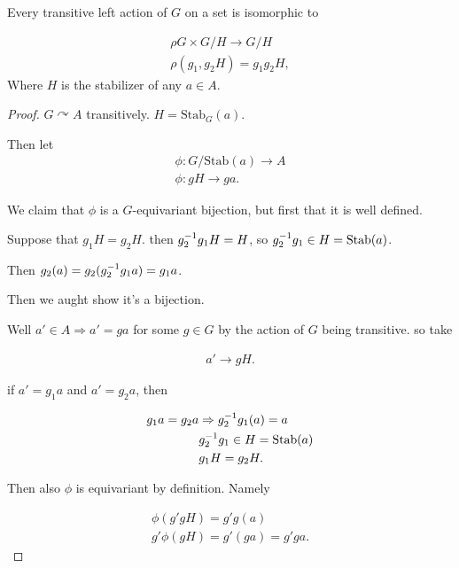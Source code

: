 \documentclass[12pt, twosided]{article}
\begin{document}
\begin{prop}
  Every transitive left action of \(G\) on a set is isomorphic to

  \begin{align*}
    \rho G \times G/H \to G/H \\
    \rho(g_1, g_2H) = g_1g_2H,
  \end{align*}
  Where \(H\) is the stabilizer of any \(a \in A\).
\end{prop}
\begin{proof}
  \(G \curvearrowright A\) transitively. \(H = \mathrm{Stab}_G(a)\).

  Then let
  \begin{align*}
    \phi: G/\mathrm{Stab}(a) \to A \\
    \phi: gH \to ga.
  \end{align*}

  We claim that \(\phi\) is a \(G\)-equivariant bijection, but first that it is well defined.

  Suppose that \(g_1H = g_2H\). then \(g_2^{-1}g_1H = H\), so \(g_2^{-1}g_1 \in H = \mathrm{Stab}(a)\).

  Then \(g_2(a) = g_2(g_2^{-1}g_1a) = g_1a\). \partdone

  Then we aught show it's a bijection.

  Well \(a\prime \in A \Rightarrow a\prime = ga\) for some \(g \in G\) by the action of \(G\) being transitive. so take

  \begin{align*}
    a\prime \longrightarrow gH.
  \end{align*}

  if \(a\prime = g_1a\) and \(a\prime = g_2a\), then

  \begin{align*}
    g_1a = g_2a &\Rightarrow g_2^{-1}g_1(a) = a \\
                & g_2^{-1}g_1 \in H = \mathrm{Stab}(a) \\
                &g_1H = g_2H.
  \end{align*} \partdone

  Then also \(\phi\) is equivariant by definition. Namely

  \begin{align*}
    \phi(g\prime g H) = g\prime g(a) \\
    g\prime \phi(gH) = g\prime(ga) = g\prime g a.
  \end{align*}
\end{proof}
\end{document}
